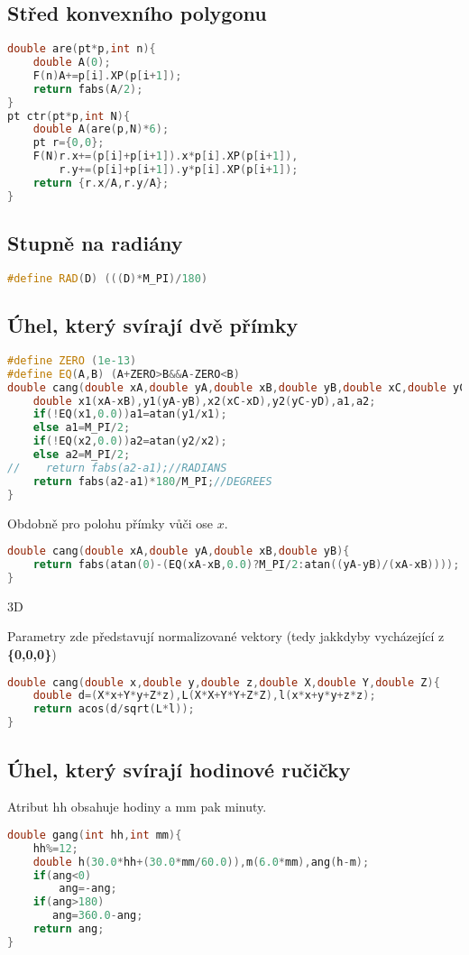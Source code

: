 \documentclass[11pt]{article}
\begin{document}
\subsection{Střed konvexního polygonu}
\begin{lstlisting}[language=C++]
double are(pt*p,int n){
    double A(0);
    F(n)A+=p[i].XP(p[i+1]);
    return fabs(A/2);
}
pt ctr(pt*p,int N){
    double A(are(p,N)*6);
    pt r={0,0};
    F(N)r.x+=(p[i]+p[i+1]).x*p[i].XP(p[i+1]),
        r.y+=(p[i]+p[i+1]).y*p[i].XP(p[i+1]);
    return {r.x/A,r.y/A};
}
\end{lstlisting}
\subsection{Stupně na radiány}
\begin{lstlisting}[language=C++]
#define RAD(D) (((D)*M_PI)/180)
\end{lstlisting}
\subsection{Úhel, který svírají dvě přímky}
\begin{lstlisting}[language=C++]
#define ZERO (1e-13)
#define EQ(A,B) (A+ZERO>B&&A-ZERO<B)
double cang(double xA,double yA,double xB,double yB,double xC,double yC,double xD,double yD){
    double x1(xA-xB),y1(yA-yB),x2(xC-xD),y2(yC-yD),a1,a2;
    if(!EQ(x1,0.0))a1=atan(y1/x1);
    else a1=M_PI/2;
    if(!EQ(x2,0.0))a2=atan(y2/x2);
    else a2=M_PI/2;
//    return fabs(a2-a1);//RADIANS
    return fabs(a2-a1)*180/M_PI;//DEGREES
}
\end{lstlisting}
Obdobně pro polohu přímky vůči ose $x$.
\begin{lstlisting}[language=C++]
double cang(double xA,double yA,double xB,double yB){
    return fabs(atan(0)-(EQ(xA-xB,0.0)?M_PI/2:atan((yA-yB)/(xA-xB))));
}
\end{lstlisting}
\begin{center}
3D
\end{center}
Parametry zde představují normalizované vektory (tedy jakkdyby vycházející z \textbf{\{0,0,0\}})
\begin{lstlisting}[language=C++]
double cang(double x,double y,double z,double X,double Y,double Z){
    double d=(X*x+Y*y+Z*z),L(X*X+Y*Y+Z*Z),l(x*x+y*y+z*z);
    return acos(d/sqrt(L*l));
}
\end{lstlisting}
\subsection{Úhel, který svírají hodinové ručičky}
Atribut hh obsahuje hodiny a mm pak minuty.
\begin{lstlisting}[language=C++]
double gang(int hh,int mm){
    hh%=12;
    double h(30.0*hh+(30.0*mm/60.0)),m(6.0*mm),ang(h-m);
    if(ang<0)
        ang=-ang;
    if(ang>180)
       ang=360.0-ang;
    return ang;
}
\end{lstlisting}
\end{document}
